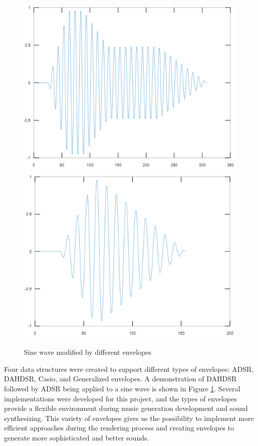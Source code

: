 \documentclass[runningheads]{llncs}
\begin{document}
\begin{figure}[!htb]
    \centering
    \includegraphics[scale=0.3]{sine1.png}
    \includegraphics[scale=0.3]{sine2.png}
    \caption{Sine wave modified by different envelopes}
    \label{fig:modifiedsines}
\end{figure}

Four data structures were created to support different types of envelopes: ADSR, DAHDSR, Casio, and Generalized envelopes. A demonstration of DAHDSR followed by ADSR being applied to a sine wave is shown in Figure \ref{fig:modifiedsines}.
Several implementations were developed for this project, and the types of envelopes provide a flexible environment during music generation development and sound synthesizing. This variety of envelopes gives us the possibility to implement more efficient approaches during the rendering process and creating envelopes to generate more sophisticated and better sounds.
\end{document}
